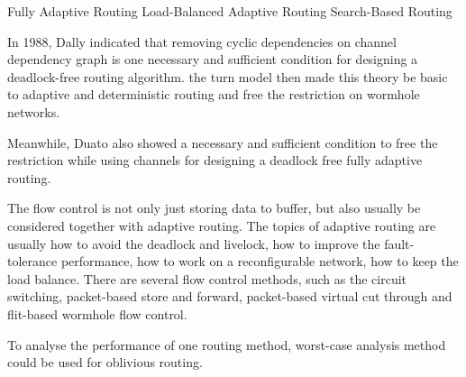 	Fully Adaptive Routing	
	Load-Balanced Adaptive Routing	
	Search-Based Routing	
\par In 1988, Dally indicated that removing cyclic dependencies on channel dependency graph is one necessary and sufficient condition for designing a deadlock-free routing algorithm\cite{dally1987deadlock}\cite{ebrahimi2017ebda}. the turn model then made this theory be basic to adaptive and deterministic routing and free the restriction on wormhole networks.\cite{ebrahimi2017ebda}\cite{glass1992turn}
\par Meanwhile, Duato also showed a necessary and sufficient condition to free the restriction while using channels for designing a deadlock free fully adaptive routing.\cite{duato1993new}\cite{ebrahimi2017ebda}
\par The flow control is not only just storing data to buffer, but also usually be considered together with adaptive routing. The topics of adaptive routing are usually how to avoid the deadlock and livelock, how to improve the fault-tolerance performance, how to work on a reconfigurable network, how to keep the load balance. There are several flow control methods, such as the circuit switching, packet-based store and forward, packet-based virtual cut through and flit-based wormhole flow control.
\par To analyse the performance of one routing method, worst-case analysis method\cite{towles2002worst} could be used for oblivious routing. 
